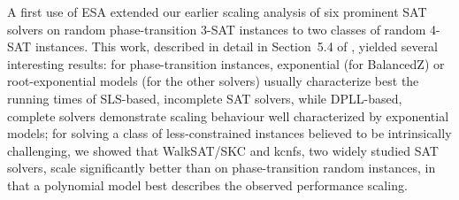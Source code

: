 \documentclass[aic]{iosart2x}
\begin{document}
A first use of ESA extended our earlier scaling analysis of six prominent SAT solvers on random phase-transition 3-SAT instances \cite{MuHoo15} to two classes of random 4-SAT instances. This work, described in detail in Section~5.4 of \cite{Mu15}, yielded several interesting results: for phase-transition instances, exponential (for BalancedZ) or root-exponential models (for the other solvers) usually characterize best the running times of SLS-based, incomplete SAT solvers, while DPLL-based, complete solvers demonstrate scaling behaviour well characterized by exponential models; for solving a class of less-constrained instances believed to be intrinsically challenging, we showed that WalkSAT/SKC and kcnfs, two widely studied SAT solvers, scale significantly better than on phase-transition random instances, in that a polynomial model best describes the observed performance scaling.
\end{document}
